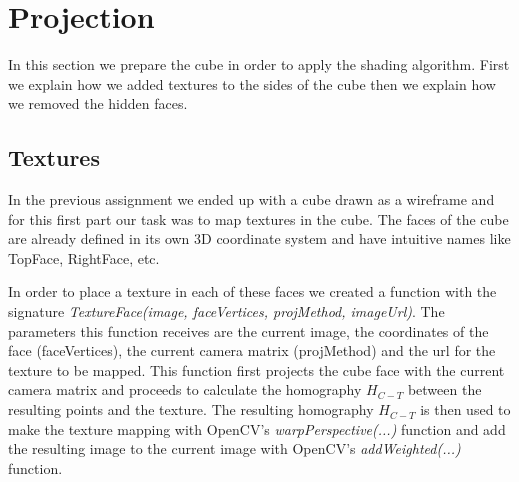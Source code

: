 \section{Projection}
	In this section we prepare the cube in order to apply the shading algorithm. First we explain how we added textures to the sides of the cube then we explain how we removed the hidden faces.
\subsection{Textures}
In the previous assignment we ended up with a cube drawn as a wireframe and for this first part our task was to map textures in the cube. The faces of the cube are already defined in its own 3D coordinate system and have intuitive names like TopFace, RightFace, etc.\newline

In order to place a texture in each of these faces we created a function with the signature \emph{TextureFace(image, faceVertices, projMethod, imageUrl)}. The parameters this function receives are the current image, the coordinates of the face (faceVertices), the current camera matrix (projMethod) and the url for the texture to be mapped. This function first projects the cube face with the current camera matrix and proceeds to calculate the homography \(H_{C-T}\) between the resulting points and the texture. The resulting homography \(H_{C-T}\) is then used to make the texture mapping with OpenCV's \emph{warpPerspective(...)} function and add the resulting image to the current image with OpenCV's \emph{addWeighted(...)} function.\newline

